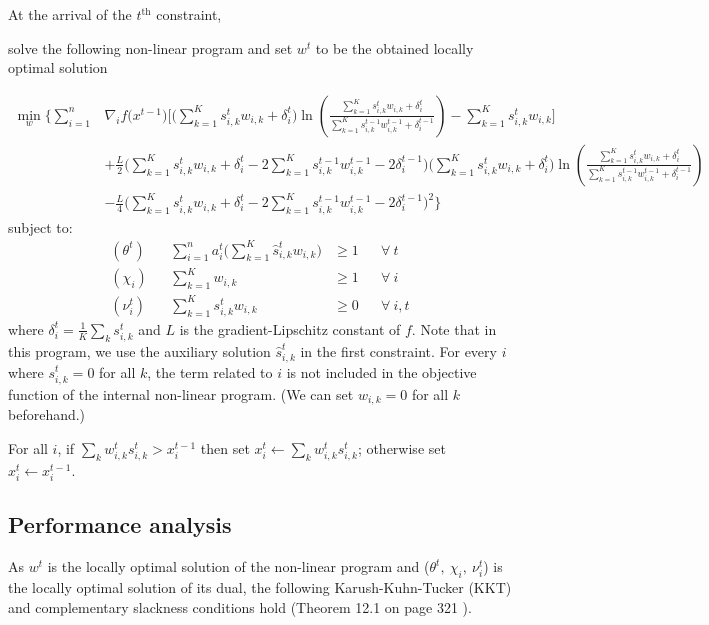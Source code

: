 At the arrival of the $t^{\text{th}}$ constraint,
\begin{compactenum}
\item solve the following non-linear program and set $w^t$ to be the obtained locally optimal solution

\begin{align*}
\min_{w} \biggl\{\sum_{i=1}^{n}
&\nabla_{i} f\bigl(x^{t-1} \bigr) \biggl[  \biggl(\sum_{k=1}^{K} s_{i,k}^{t} w_{i,k}  + \delta_{i}^{t} \biggr)
\ln \left(\frac{ \sum_{k=1}^{K} s_{i,k}^{t} w_{i,k}  + \delta_{i}^{t} }{\sum_{k=1}^{K} s_{i,k}^{t-1} w_{i,k}^{t-1} + \delta_{i}^{t-1}}\right)
- \sum_{k=1}^{K}  s_{i,k}^{t} w_{i,k} \biggr] \\
%
&+ \frac{L}{2}\biggl( \sum_{k=1}^{K} s_{i,k}^{t} w_{i,k} + \delta_{i}^{t}  - 2\sum_{k=1}^{K} s_{i,k}^{t-1} w_{i,k}^{t-1} - 2\delta_{i}^{t-1} \biggr) \biggl(\sum_{k=1}^{K} s_{i,k}^{t} w_{i,k} + \delta_{i}^{t} \biggr)
\ln \left(\frac{ \sum_{k=1}^{K} s_{i,k}^{t} w_{i,k}  + \delta_{i}^{t} }{\sum_{k=1}^{K} s_{i,k}^{t-1} w_{i,k}^{t-1}  + \delta_{i}^{t-1}}\right) \\
%
&- \frac{L}{4} \biggl( \sum_{k=1}^{K} s_{i,k}^{t} w_{i,k} + \delta_{i}^{t}  - 2\sum_{k=1}^{K} s_{i,k}^{t-1} w_{i,k}^{t-1} - 2\delta_{i}^{t-1} \biggr)^{2}
\biggr\}
\end{align*}
%
\noindent subject to:
%
\begin{align*}
    (\theta^{t})  && \sum_{i=1}^{n} a_{i}^{t} \biggl( \sum_{k=1}^{K}  \hat{s}_{i,k}^{t} w_{i,k} \biggr) &\geq 1 && \forall\ t\\
    (\chi_{i}) && \sum_{k=1}^{K}  w_{i,k} &\geq 1 && \forall\ i\\
    (\nu_{i}^{t}) && \sum_{k=1}^{K} s_{i,k}^{t} w_{i,k} &\geq 0 && \forall\ i,t
\end{align*}
%
where $\delta_{i}^{t} = \frac{1}{K} \sum_{k} s_{i,k}^{t}$ and $L$ is the gradient-Lipschitz constant of $f$.
Note that in this program, we use the auxiliary solution $\hat{s}_{i,k}^{t}$ in the first constraint. For every $i$ where $s_{i,k}^{t} = 0$ for all $k$, the term related to $i$ is not included in the objective function of the internal non-linear program.
(We can set $w_{i,k} = 0$ for all $k$ beforehand.)
%
\item For all $i$, if $\sum_{k} w_{i,k}^{t} s_{i,k}^{t} > x_{i}^{t-1}$ then set $x_{i}^{t} \gets \sum_{k} w_{i,k}^{t} s_{i,k}^{t}$;
otherwise set $x_{i}^{t} \gets x_{i}^{t-1}$.
\end{compactenum}

\subsection{Performance analysis}
As $w^{t}$ is the locally optimal solution of the non-linear program and ($\theta^t,\ \chi_{i},\ \nu_{i}^{t}$) is the locally optimal solution of its dual, the following Karush-Kuhn-Tucker (KKT) and complementary slackness conditions hold (Theorem 12.1 on page 321 \cite{NocedalWright:FirstOrderOptimalityConditions}).

